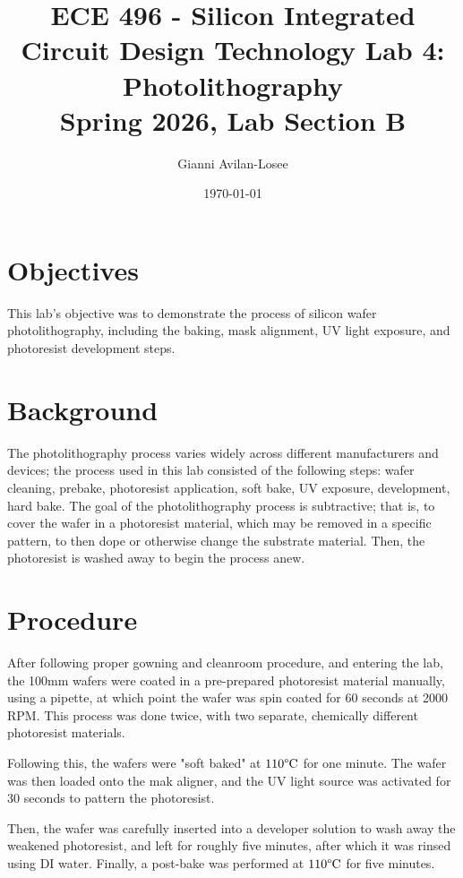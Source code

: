 \documentclass[12pt]{report}
\title{ECE 496 - Silicon Integrated Circuit Design Technology Lab 4: Photolithography\\ Spring 2026, Lab Section B}
\author{Gianni Avilan-Losee}
\date{\today}
\begin{document}
\maketitle
\setcounter{chapter}{4}
\setcounter{section}{0}
\section{Objectives}

This lab's objective was to demonstrate the process of silicon wafer photolithography, including the baking, mask alignment, UV light exposure, and photoresist development steps. 

\section{Background}

The photolithography process varies widely across different manufacturers and devices; the process used in this lab consisted of the following steps: wafer cleaning, prebake, photoresist application, soft bake, UV exposure, development, hard bake. The goal of the photolithography process is subtractive; that is, to cover the wafer in a photoresist material, which may be removed in a specific pattern, to then dope or otherwise change the substrate material. Then, the photoresist is washed away to begin the process anew\cite{textbook}.

\section{Procedure}

After following proper gowning and cleanroom procedure, and entering the lab, the 100mm wafers were coated in a pre-prepared photoresist material manually, using a pipette, at which point the wafer was spin coated for 60 seconds at 2000 RPM. This process was done twice, with two separate, chemically different photoresist materials. 

Following this, the wafers were "soft baked" at \(110 \degree \mathrm{C}\) for one minute. The wafer was then loaded onto the mak aligner, and the UV light source was activated for 30 seconds to pattern the photoresist.

Then, the wafer was carefully inserted into a developer solution to wash away the weakened photoresist, and left for roughly five minutes, after which it was rinsed using DI water. Finally, a post-bake was performed at \(110 \degree \mathrm{C}\) for five minutes.
\end{document}
